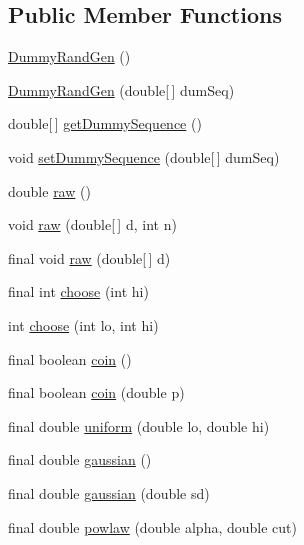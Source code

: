 \subsection*{Public Member Functions}
\begin{DoxyCompactItemize}
\item 
\hyperlink{classnet_1_1sf_1_1jclec_1_1util_1_1random_1_1_dummy_rand_gen_a5e9875d803e71ea99886b27189794e86}{Dummy\-Rand\-Gen} ()
\item 
\hyperlink{classnet_1_1sf_1_1jclec_1_1util_1_1random_1_1_dummy_rand_gen_a9923f167a9e416f17bf9b0c265e5510b}{Dummy\-Rand\-Gen} (double\mbox{[}$\,$\mbox{]} dum\-Seq)
\item 
double\mbox{[}$\,$\mbox{]} \hyperlink{classnet_1_1sf_1_1jclec_1_1util_1_1random_1_1_dummy_rand_gen_a281ba055c9c6e0fde87bc9ae96bdab6b}{get\-Dummy\-Sequence} ()
\item 
void \hyperlink{classnet_1_1sf_1_1jclec_1_1util_1_1random_1_1_dummy_rand_gen_adac5cb50b26ef7e1a0e3faee9865e42b}{set\-Dummy\-Sequence} (double\mbox{[}$\,$\mbox{]} dum\-Seq)
\item 
double \hyperlink{classnet_1_1sf_1_1jclec_1_1util_1_1random_1_1_dummy_rand_gen_a7ecbc016777a37e970e8543c98c14d8a}{raw} ()
\item 
void \hyperlink{classnet_1_1sf_1_1jclec_1_1util_1_1random_1_1_dummy_rand_gen_a38cf447db780fada212a1e0e2b082021}{raw} (double\mbox{[}$\,$\mbox{]} d, int n)
\item 
final void \hyperlink{classnet_1_1sf_1_1jclec_1_1util_1_1random_1_1_dummy_rand_gen_a6514a30f395f08b564b6b5844bc9a5cf}{raw} (double\mbox{[}$\,$\mbox{]} d)
\item 
final int \hyperlink{classnet_1_1sf_1_1jclec_1_1util_1_1random_1_1_dummy_rand_gen_af329cf5ab656a3866eca5b32f0581e7d}{choose} (int hi)
\item 
int \hyperlink{classnet_1_1sf_1_1jclec_1_1util_1_1random_1_1_dummy_rand_gen_acc5c12a791cb81dde1cc0551b2d92ca0}{choose} (int lo, int hi)
\item 
final boolean \hyperlink{classnet_1_1sf_1_1jclec_1_1util_1_1random_1_1_dummy_rand_gen_ab1b55d5aef0efdedc8e081d79a55f73b}{coin} ()
\item 
final boolean \hyperlink{classnet_1_1sf_1_1jclec_1_1util_1_1random_1_1_dummy_rand_gen_a340eedaf204cea38f6021154088f3be1}{coin} (double p)
\item 
final double \hyperlink{classnet_1_1sf_1_1jclec_1_1util_1_1random_1_1_dummy_rand_gen_a327d55b8d886a4ea4c8b20e685ad3031}{uniform} (double lo, double hi)
\item 
final double \hyperlink{classnet_1_1sf_1_1jclec_1_1util_1_1random_1_1_dummy_rand_gen_a89e52e23a4fbc7b4ac45836012c6df39}{gaussian} ()
\item 
final double \hyperlink{classnet_1_1sf_1_1jclec_1_1util_1_1random_1_1_dummy_rand_gen_ac6416b6bcfe04c5db756eba9833be667}{gaussian} (double sd)
\item 
final double \hyperlink{classnet_1_1sf_1_1jclec_1_1util_1_1random_1_1_dummy_rand_gen_a7af42bf24cdc59f4f93d1458667739fb}{powlaw} (double alpha, double cut)
\end{DoxyCompactItemize}
